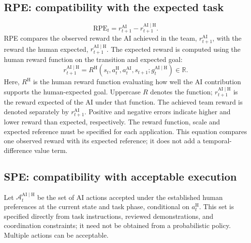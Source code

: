\documentclass[11pt]{article}
\newcommand{\AIH}{\mathrm{AI}\mid\mathrm{H}}
\newcommand{\RPE}{\mathrm{RPE}}
\newcommand{\At}{\mathcal{A}_t^{\AIH}}
\newcommand{\gt}{g_t^{\AIH}}
\begin{document}
\subsection{RPE: compatibility with the expected task}
\begin{equation}
 \boxed{\RPE_t=r_{t+1}^{\mathrm{AI}}-r_{t+1}^{\AIH}.}
 \label{eq:rpe}
\end{equation}
RPE compares the observed reward the AI achieved in the team,
$r_{t+1}^{\mathrm{AI}}$, with the reward the human expected,
$r_{t+1}^{\AIH}$. The expected reward is computed using the human reward
function on the transition and expected goal:
\begin{equation}
 r_{t+1}^{\AIH}
 =R^{\mathrm H}\!\left(s_t,a_t^{\mathrm H},a_t^{\mathrm{AI}},s_{t+1};\gt\right)
 \in\mathbb{R}.
 \label{eq:reward}
\end{equation}
Here, $R^{\mathrm H}$ is the human reward function evaluating how well the AI
contribution supports the human-expected goal. Uppercase $R$ denotes the
function; $r_{t+1}^{\AIH}$ is the reward expected of the AI under that function.
The achieved team reward is denoted separately by $r_{t+1}^{\mathrm{AI}}$.
Positive and negative errors indicate higher and lower reward than expected,
respectively. The reward function, scale and expected reference must be
specified for each application. This equation compares one observed reward
with its expected reference; it does not add a temporal-difference value term.

\subsection{SPE: compatibility with acceptable execution}
Let $\At$ be the set of AI actions accepted under the established human
preferences at the current state and task phase, conditional on
$a_t^{\mathrm H}$. This set is specified directly from task instructions,
reviewed demonstrations, and coordination constraints; it need not be
obtained from a probabilistic policy. Multiple actions can be acceptable.
\end{document}

